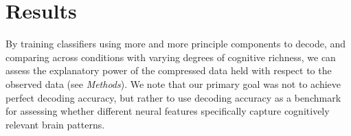\documentclass[english]{article}
\begin{document}






\section*{Results}
By training classifiers using more and more principle components to decode, and comparing across conditions with varying degrees of cognitive richness, we can assess the explanatory power of the compressed data held with respect to the observed data (see \textit{Methods}). We note that our primary goal was not to achieve perfect decoding accuracy, but rather to use decoding accuracy as a benchmark for assessing whether different neural features specifically capture cognitively relevant brain patterns.
\end{document}
